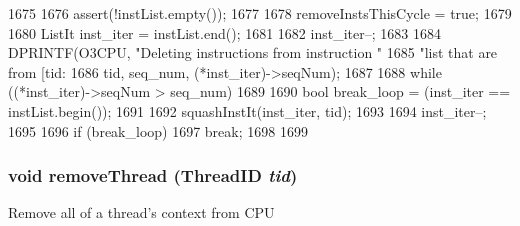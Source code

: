 \begin{DoxyCode}
1675 {
1676     assert(!instList.empty());
1677 
1678     removeInstsThisCycle = true;
1679 
1680     ListIt inst_iter = instList.end();
1681 
1682     inst_iter--;
1683 
1684     DPRINTF(O3CPU, "Deleting instructions from instruction "
1685             "list that are from [tid:%
1686             tid, seq_num, (*inst_iter)->seqNum);
1687 
1688     while ((*inst_iter)->seqNum > seq_num) {
1689 
1690         bool break_loop = (inst_iter == instList.begin());
1691 
1692         squashInstIt(inst_iter, tid);
1693 
1694         inst_iter--;
1695 
1696         if (break_loop)
1697             break;
1698     }
1699 }
\end{DoxyCode}
\hypertarget{classFullO3CPU_a5fd824111bd328c70c3060d121ac5d49}{
\subsubsection[{removeThread}]{\setlength{\rightskip}{0pt plus 5cm}void removeThread ({\bf ThreadID} {\em tid})}}
\label{classFullO3CPU_a5fd824111bd328c70c3060d121ac5d49}
Remove all of a thread's context from CPU 


